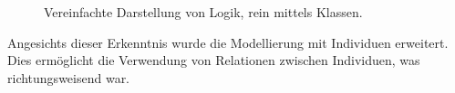 \begin{figure}[H]
\centering {}
\caption{Vereinfachte Darstellung von Logik, rein mittels Klassen.\label{fig:prolog_logik_baum}\protect\footnotemark}
\end{figure}

Angesichts dieser Erkenntnis wurde die Modellierung mit Individuen erweitert. Dies ermöglicht die Verwendung von Relationen zwischen Individuen, was richtungsweisend war.

